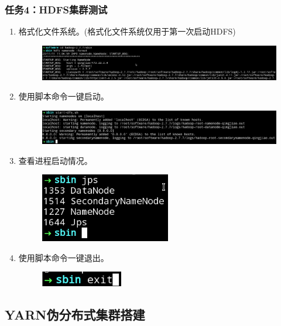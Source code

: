 \documentclass {article}
\begin{document}
			\subsubsection{任务4：HDFS集群测试}
				\begin{enumerate}
					\item 格式化文件系统。(格式化文件系统仅用于第一次启动HDFS)
					\begin{figure}[H]
						\centering
						\includegraphics[width=4.5in]{figures/fig28.png}
					\end{figure}
				
					\item 使用脚本命令一键启动。
					\begin{figure}[H]
						\centering
						\includegraphics[width=4.5in]{figures/fig29.png}
					\end{figure}
				
					\item 查看进程启动情况。
					\begin{figure}[H]
						\centering
						\includegraphics{figures/fig30.png}
					\end{figure}
				
					\item 使用脚本命令一键退出。
					\begin{figure}[H]
						\centering
						\includegraphics{figures/fig31.png}
					\end{figure}
				\end{enumerate}
			
		\subsection{YARN伪分布式集群搭建}
\end{document}
